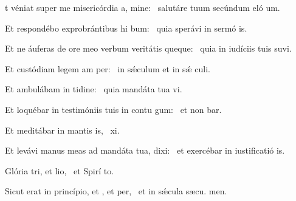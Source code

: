 \begin{psalm}
\begin{intonation}
t véniat super me misericórdia a, mine:~{\gstella} salutáre tuum secúndum eló um.
\end{intonation}
\begin{verses}
\item Et respondébo exprobrántibus hi bum:~{\gstella} quia sperávi in sermó is.
\item Et ne áuferas de ore meo verbum veritátis queque:~{\gstella} quia in iudíciis tuis suvi.
\item Et custódiam legem am per:~{\gstella} in sǽculum et in sǽ culi.
\item Et ambulábam in tidine:~{\gstella} quia mandáta tua vi.
\item Et loquébar in testimóniis tuis in contu gum:~{\gstella} et non bar.
\item Et meditábar in mantis is,~{\gstella}  xi.
\item Et levávi manus meas ad mandáta tua,  dixi:~{\gstella} et exercébar in iustificatió is.
\item Glória tri, et lio,~{\gstella} et Spirí to.
\item Sicut erat in princípio, et , et per,~{\gstella} et in sǽcula sæcu. men.
\end{verses}
\end{psalm}

